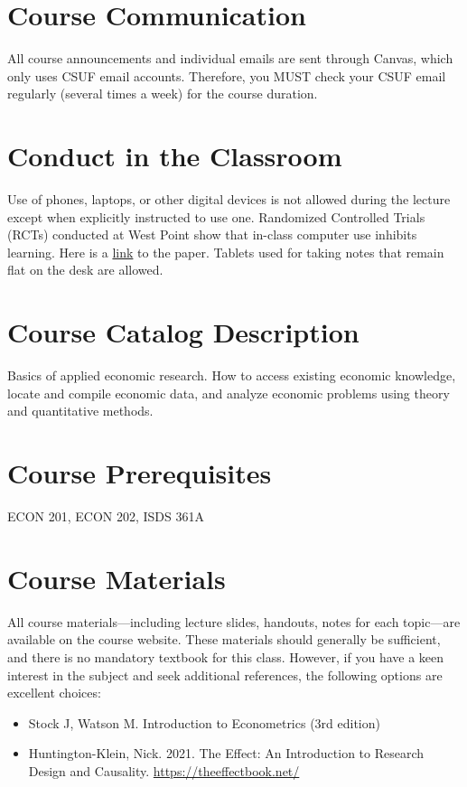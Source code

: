 \documentclass{syllabus}
\begin{document}
\section*{Course Communication}
All course announcements and individual emails are sent through Canvas, which only uses CSUF email accounts. Therefore, you MUST check your CSUF email regularly (several times a week) for the course duration.

\section*{Conduct in the Classroom}
Use of phones, laptops, or other digital devices is not allowed during the lecture except when explicitly instructed to use one. Randomized Controlled Trials (RCTs) conducted at West Point show that in-class computer use inhibits learning. Here is a \href{https://oema.army.mil/pub/2017_Carter_Greenberg_Walker_Computer_Usage_RCT_USMA.pdf}{link} to the paper. Tablets used for taking notes that remain flat on the desk are allowed.

\section*{Course Catalog Description}
Basics of applied economic research. How to access existing economic knowledge, locate and compile economic data, and analyze economic problems using theory and quantitative methods.

\section*{Course Prerequisites}
ECON 201, ECON 202, ISDS 361A

\section*{Course Materials}
All course materials---including lecture slides, handouts, notes for each topic—are available on the course website. These materials should generally be sufficient, and there is no mandatory textbook for this class. However, if you have a keen interest in the subject and seek additional references, the following options are excellent choices:

\begin{itemize}
\item Stock J, Watson M. Introduction to Econometrics (3rd edition) \item Huntington-Klein, Nick. 2021. The Effect: An Introduction to Research Design and Causality. \href{https://theeffectbook.net/}{https://theeffectbook.net/}
\end{itemize}
\end{document}
